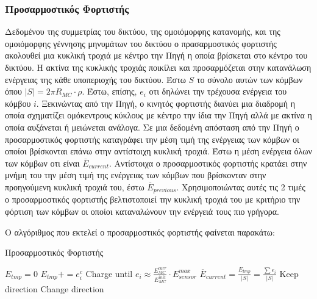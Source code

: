 \subsubsection{Προσαρμοστικός Φορτιστής}
Δεδομένου της συμμετρίας του δικτύου, της ομοιόμορφης κατανομής, και της ομοιόμορφης γέννησης μηνυμάτων του δικτύου ο πρασαρμοστικός φορτιστής ακολουθεί μια κυκλική
τροχιά με κέντρο την Πηγή η οποία βρίσκεται στο κέντρο του δικτύου. Η ακτίνα της κυκλικής τροχιάς ποικίλει και προσαρμόζεται στην κατανάλωση ενέργειας της κάθε
υποπεριοχής του δικτύου. Έστω $S$ το σύνολο αυτών των κόμβων όπου $|S| = 2\pi R_{MC}\cdot \rho$. Έστω, επίσης, $e_{i}$ οτι δηλώνει την τρέχουσα ενέργεια του κόμβου
$i$. Ξεκινώντας από την Πηγή, ο κινητός φορτιστής διανύει μια διαδρομή η οποία σχηματίζει ομόκεντρους κύκλους με κέντρο την ίδια την Πηγή αλλά με ακτίνα η οποία
αυξάνεται ή μειώνεται ανάλογα. Σε μια δεδομένη απόσταση από την Πηγή ο προσαρμοστικός φορτιστής καταγράφει την μέση τιμή της ενέργειας των κόμβων οι οποίοι
βρίσκονται επάνω στην αντίστοιχη κυκλική τροχιά. Έστω η μέση ενέργεια όλων των κόμβων οτι είναι $\overline{E}_{current}$. Αντίστοιχα ο προσαρμοστικός φορτιστής
κρατάει στην μνήμη του την μέση τιμή της ενέργειας των κόμβων που βρίσκονταν στην προηγούμενη κυκλική τροχιά του, έστω $\overline{E}_{previous}$. Χρησιμοποιώντας
αυτές τις 2 τιμές ο προσαρμοστικός φορτιστής βελτιστοποιεί την κυκλική τροχιά του με κριτήριο την φόρτιση των κόμβων οι οποίοι καταναλώνουν την ενέργειά τους πιο
γρήγορα.

Ο αλγόριθμος που εκτελεί ο προσαρμοστικός φορτιστής φαίνεται παρακάτω:
\vspace{0.1cm}
\begin{algorithm}
\begin{algorithmic}
\caption{Προσαρμοστικός Φορτιστής}
\State $E_{tmp}=0$
\State $E_{tmp}+=e_{i}^{c}$
\State Charge until $e_{i} \approx \frac{E_{MC}^{curr}}{E_{MC}^{init}}\cdot E_{sensor}^{max}$
\EndFor
\State $\overline{E}_{current}=\frac{E_{tmp}}{|S|} = \frac{\sum e_{i}}{|S|}$
		\State	Keep direction
	\Else
		\State Change direction
	\EndIf
\EndIf
\EndWhile
\end{algorithmic}
\end{algorithm}

